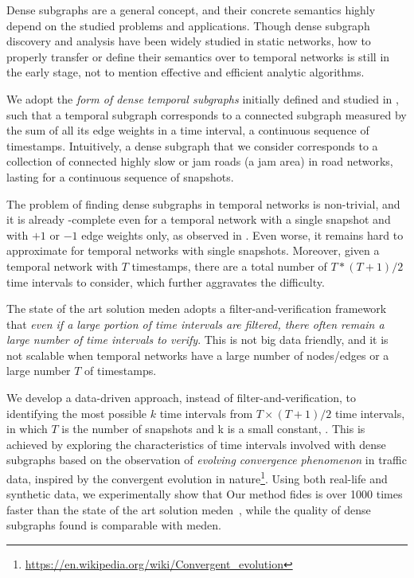 Dense subgraphs are a general concept, and their concrete semantics highly depend on the studied problems and applications. Though  dense subgraph discovery and analysis have been widely studied in static networks, how to properly transfer or define their semantics over to temporal networks is still in the early stage, not to mention effective and efficient analytic algorithms.

We adopt the {\em form of dense temporal subgraphs} initially defined and studied in \cite{BogdanovMS11}, such that a temporal subgraph corresponds to a connected subgraph measured by the sum of all its edge weights in a time interval, \ie  a continuous sequence of timestamps. Intuitively, a dense subgraph that we consider  corresponds to a  collection of connected highly slow or jam roads (\ie  a jam area) in road networks, lasting for a continuous sequence of snapshots.


The problem of  finding dense subgraphs in temporal networks is non-trivial, and it is already \NP-complete even for a temporal network with a single snapshot and with $+1$ or $-1$ edge weights only, as observed in \cite{BogdanovMS11}. Even worse, it remains hard to approximate for temporal networks  with single snapshots.
Moreover, given a temporal network with $T$ timestamps, there are a total number of $T*(T+1)/2$ time intervals to consider, which further aggravates the difficulty.

The state of the art solution {\sc meden} \cite{BogdanovMS11} adopts a filter-and-verification framework that {\em even if a large portion of time intervals are filtered, there often remain a large number of time intervals to verify}. This is not big data friendly, and it is not scalable when temporal networks have a large number of nodes/edges or a large number $T$ of timestamps.


We develop a data-driven approach, instead of filter-and-verification, to  identifying the most possible $k$ time intervals from $T \times (T + 1)/2$ time intervals, in which $T$ is the number of snapshots and k is a small constant, . This is achieved by exploring the characteristics of time intervals involved with dense subgraphs based on the observation of {\em evolving convergence phenomenon} in traffic data, inspired by the convergent evolution in nature\footnote{\small \url{https://en.wikipedia.org/wiki/Convergent_evolution}}. Using both real-life and synthetic data, we experimentally show that Our method {\sc fides} is over 1000 times faster than the state of the art solution {\sc meden}~\cite{BogdanovMS11}, while the quality of dense subgraphs found is comparable with {\sc meden}.

